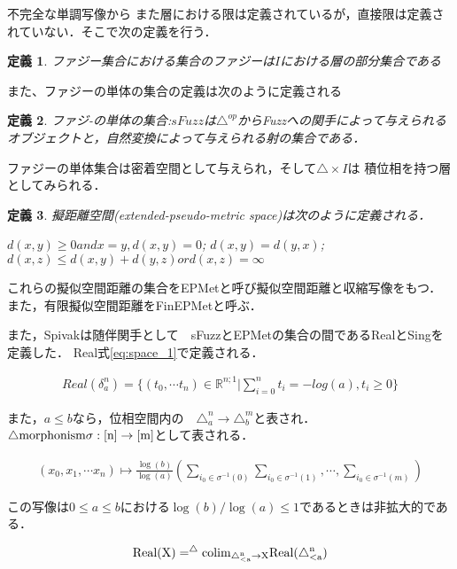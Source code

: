 \documentclass{jsarticle}
\newtheorem{dfn}{定義}
\begin{document}
不完全な単調写像から
また層における限は定義されているが，直接限は定義されていない．そこで次の定義を行う．
\begin{dfn}
  ファジー集合における集合のファジーは$I$における層の部分集合である
\end{dfn}

また、ファジーの単体の集合の定義は次のように定義される
\begin{dfn}
  ファジ-の単体の集合:$sFuzz$は$\triangle^{op}$からFuzzへの関手によって与えられる
  オブジェクトと，自然変換によって与えられる射の集合である．
\end{dfn}

ファジーの単体集合は密着空間として与えられ，そして$\triangle \times I$は
積位相を持つ層としてみられる．
\begin{dfn}
擬距離空間(extended-pseudo-metric space)は次のように定義される．
\begin{enumerate}
  $d(x,y) \ge 0 and x=y,d(x,y)=0$;
  $d(x,y) = d(y,x)$;
  $d(x,z) \le d(x,y) + d(y,z) or d(x,z)=\infty$
\end{enumerate}
\end{dfn}
これらの擬似空間距離の集合をEPMetと呼び擬似空間距離と収縮写像をもつ．
また，有限擬似空間距離をFinEPMetと呼ぶ．

また，Spivakは随伴関手として　sFuzzとEPMetの集合の間であるRealとSingを定義した．
Real式\ref{eq:space_1}で定義される．
 
\begin{eqnarray}
  \label{eq:space_1}
  Real( \delta ^n _a) = \{ (t_0 , \cdots t_n) \in \mathbb{R}^{n;1} | \sum _{i=0} ^n t_i = -log(a),t_i \geq 0 \}
\end{eqnarray}

また，$a \le b$なら，位相空間内の　$\triangle ^n _a \rightarrow \triangle ^m _b$と表され．
$\triangle \rm{morphonism} \sigma:[n] \rightarrow [m]$として表される．

\begin{eqnarray}
  (x_0,x_1, \cdots x_n) \mapsto \frac{\log (b)}{\log (a)} \left(
    \sum _{i_0 \in \sigma ^{-1} (0) }\sum _{i_0 \in \sigma ^{-1} (1)},\cdots,\sum _{i_0 \in \sigma ^{-1} (m)} \right) 
\end{eqnarray}

この写像は$0 \leq a \leq b$における$\log(b) / \log (a) \leq 1$であるときは非拡大的である．

\begin{eqnarray}
  {\rm Real(X) = ^\triangle {\rm colim} _{\triangle ^n _{<a} \rightarrow X} Real(\triangle ^n _{<a})}
\end{eqnarray}
\end{document}
